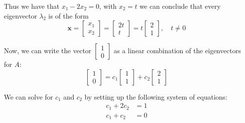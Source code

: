 Thus we have that $x_1 - 2x_2 = 0$, with $x_2=t$ we can conclude that every eigenvector $\lambda_2$ is of the form
\[
	\mathbf{x} = \begin{bmatrix}x_1\\x_2\end{bmatrix} = \begin{bmatrix}2t\\t\end{bmatrix} = t\begin{bmatrix}2\\1\end{bmatrix}, \quad t\neq 0
\]

Now, we can write the vector $\begin{bmatrix}1\\0\end{bmatrix}$ as a linear combination of the eigenvectors for $A$:
\[
	\begin{bmatrix}1\\0\end{bmatrix} = c_1\begin{bmatrix}1\\1\end{bmatrix} + c_2\begin{bmatrix}2\\1\end{bmatrix}
\]

We can solve for $c_1$ and $c_2$ by setting up the following system of equations:
\begin{align*}
	c_1 + 2c_2 & = 1 \\
	c_1 + c_2  & = 0
\end{align*}

